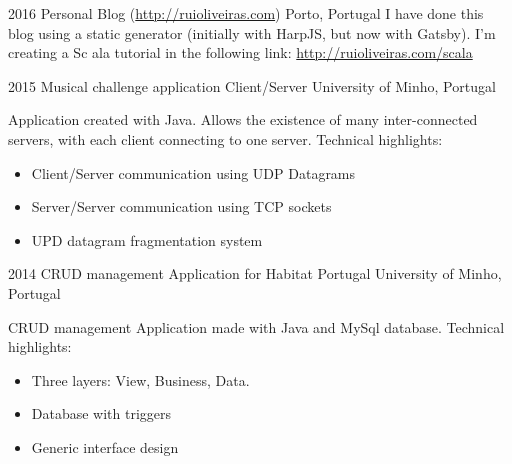 \documentclass[]{friggeri-cv} %
\begin{document}
\begin{entrylist}
\entry
{2016}
{Personal Blog {\normalfont \normalsize (\href{http://ruioliveiras.com}{http://ruioliveiras.com})}}
{Porto, Portugal}
{
  I have done this blog using a static generator (initially with HarpJS, but now with Gatsby).
  I'm creating a Sc	ala tutorial in the following link: \href{http://ruioliveiras.com/scala}{http://ruioliveiras.com/scala}
}

\entry
{2015}
{Musical challenge application Client/Server}
{University of Minho, Portugal}
{
    Application created with Java. Allows the existence of many inter-connected servers, with each client connecting to one server. Technical highlights:
\begin{itemize}
    \item Client/Server communication using UDP Datagrams
    \item Server/Server communication using TCP sockets
    \item UPD datagram fragmentation system
\end{itemize}
}



\entry
{2014}
{CRUD management Application for Habitat Portugal}
{University of Minho, Portugal}
{CRUD management Application made with Java and MySql database. Technical highlights:
\begin{itemize}
    \item Three layers: View, Business, Data.
    \item Database with triggers
    \item Generic interface design
\end{itemize}
}


\end{entrylist}
\end{document}
